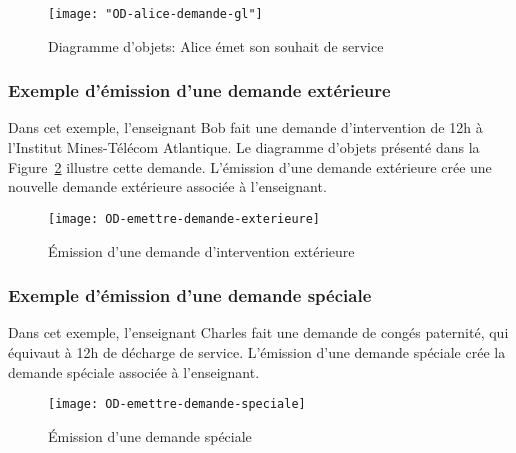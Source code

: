 \begin{ocl}
 \begin{figure}[!htbp]
 \begin{center}
 \texttt{[image: "OD-alice-demande-gl"]}
 \caption{Diagramme d'objets: Alice émet son souhait de service}
 \end{center}
 \label{fig:souhait-alice}
 \end{figure}


 \subsubsection{Exemple d'émission d'une demande extérieure}
Dans cet exemple, l'enseignant Bob fait une demande d'intervention de 12h à l'Institut Mines-Télécom Atlantique.
Le diagramme d'objets présenté dans la Figure~\ref{fig:demande:exterieure} illustre cette demande.
L'émission d'une demande extérieure crée une nouvelle demande extérieure associée à l'enseignant.
 
 \begin{figure}[!htbp]
 \begin{center}
 \texttt{[image: OD-emettre-demande-exterieure]}
 \caption{\'Emission d'une demande d'intervention extérieure}
 \label{fig:demande:exterieure}
 \end{center}
 \end{figure}

 \subsubsection{Exemple d'émission d'une demande spéciale}
Dans cet exemple, l'enseignant Charles fait une demande de congés paternité, qui équivaut à 12h de décharge de service.
L'émission d'une demande spéciale crée la demande spéciale associée à l'enseignant.
\begin{figure}[!htbp]
\begin{center}
\texttt{[image: OD-emettre-demande-speciale]}
\caption{\'Emission d'une demande spéciale}
\end{center}
\end{figure}





\end{ocl}
